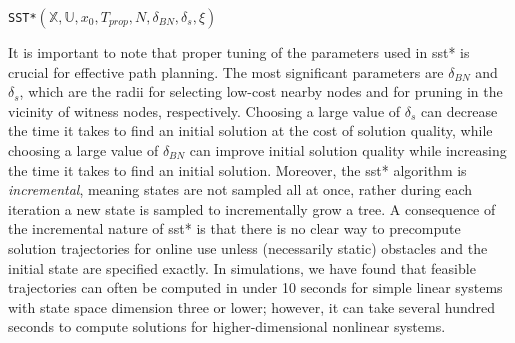 \begin{algorithm}
\caption{\texttt{SST*}$(\mathbb{X}, \mathbb{U}, x_0, T_{prop}, N, \delta_{BN}, \delta_s, \xi)$}
\label{alg:sst}
\begin{algorithmic}[1]
                \EndIf{}
            \EndIf{}
        \EndFor{}
    \EndWhile{}
\end{algorithmic}{}
\end{algorithm}

It is important to note that proper tuning of the parameters used in \gls{sst}* is crucial for effective path planning. The most significant parameters are $\delta_{BN}$ and $\delta_s$, which are the radii for selecting low-cost nearby nodes and for pruning in the vicinity of witness nodes, respectively. Choosing a large value of $\delta_s$ can decrease the time it takes to find an initial solution at the cost of solution quality, while choosing a large value of $\delta_{BN}$ can improve initial solution quality while increasing the time it takes to find an initial solution. Moreover, the \gls{sst}* algorithm is \emph{incremental}, meaning states are not sampled all at once, rather during each iteration a new state is sampled to incrementally grow a tree. A consequence of the incremental nature of \gls{sst}* is that there is no clear way to precompute solution trajectories for online use unless (necessarily static) obstacles and the initial state are specified exactly. In simulations, we have found that feasible trajectories can often be computed in under 10 seconds for simple linear systems with state space dimension three or lower; however, it can take several hundred seconds to compute solutions for higher-dimensional nonlinear systems.

